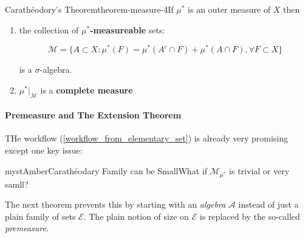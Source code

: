 \begin{mystthmtheorem}{Carathéodory's Theorem}{theorem-measure-4}If $\mu^*$ is an outer measure of $X$ then

\begin{enumerate}
\item the collection of \textbf{$\mu^*$-measureable} sets:

\begin{equation}
\mathcal M = \{A\subset X: \mu^*(F)=\mu^*(A^c \cap F)+\mu^*(A\cap F), \forall F \subset X\}
\end{equation}


is a $\sigma$-algebra.


\item $\mu^*|_{\mathcal M}$ is a \textbf{complete measure}
\end{enumerate}

\end{mystthmtheorem}
\paragraph{Premeasure and The Extension Theorem}

THe workflow (\ref{workflow_from_elementary_set}) is already very promising except one key issue:

\begin{mystadmonition}{mystAmber}{Carathéodary Family can be Small}What if $\mathcal M_{\mu^*}$ is trivial or very samll?

\end{mystadmonition}
The next theorem prevents this by starting with an \textit{algebra} $\mathcal A$ instead of just a plain family of sets $\mathcal E$.  The plain notion of size on $\mathcal E$ is replaced by the so-called \textit{premeasure}.


